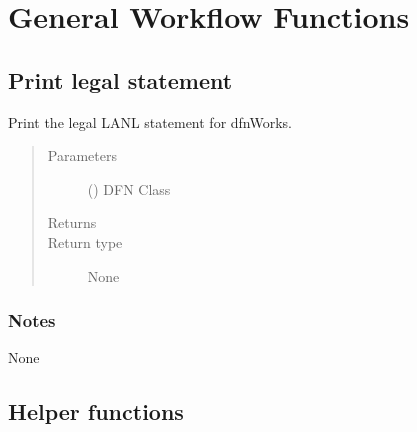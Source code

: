 \documentclass[letterpaper,10pt,english]{sphinxmanual}
\begin{document}
\section{General Workflow Functions}
\label{\detokenize{pydfnworks:general-workflow-functions}}

\subsection{Print legal statement}
\label{\detokenize{pydfnworks:module-pydfnworks.general.legal}}\label{\detokenize{pydfnworks:print-legal-statement}}

\begin{fulllineitems}
\label{\detokenize{pydfnworks:pydfnworks.general.legal.legal}}
Print the legal LANL statement for dfnWorks.
\begin{quote}\begin{description}
\item[{Parameters}] \leavevmode
{} () \textendash{} DFN Class

\item[{Returns}] \leavevmode


\item[{Return type}] \leavevmode
None

\end{description}\end{quote}
\subsubsection*{Notes}

None

\end{fulllineitems}



\subsection{Helper functions}
\label{\detokenize{pydfnworks:module-pydfnworks.general.general_functions}}\label{\detokenize{pydfnworks:helper-functions}}
\end{document}

